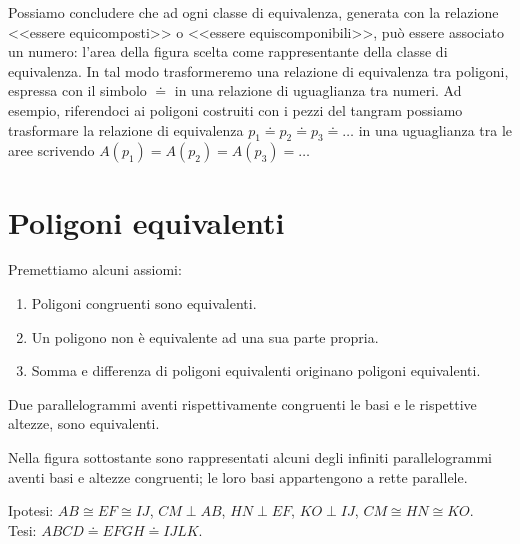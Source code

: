 Possiamo concludere che ad ogni classe di equivalenza, generata con la relazione <<essere equicomposti>> o <<essere equiscomponibili>>, può essere associato un numero: l'area della figura scelta come rappresentante della classe di equivalenza. In tal modo trasformeremo una relazione di equivalenza tra poligoni, espressa con il simbolo $\doteq$ in una relazione di uguaglianza tra numeri.
Ad esempio, riferendoci ai poligoni costruiti con i pezzi del tangram possiamo trasformare la relazione di equivalenza $p_1\doteq p_2\doteq p_3\doteq \ldots{}$ in una uguaglianza tra le aree scrivendo $A(p_1)=A(p_2)=A(p_3)=\ldots{}$


\section{Poligoni equivalenti}

Premettiamo alcuni assiomi:
\begin{enumerate}
\item Poligoni congruenti sono equivalenti.
\item Un poligono non è equivalente ad una sua parte propria.
\item Somma e differenza di poligoni equivalenti originano poligoni equivalenti.
\end{enumerate}

\begin{teorema}\label{teo:7.1}
Due parallelogrammi aventi rispettivamente congruenti le basi e le rispettive altezze, sono equivalenti.
\end{teorema}

Nella figura sottostante sono rappresentati alcuni degli infiniti parallelogrammi aventi basi e altezze congruenti; le loro basi appartengono a rette parallele. 

\noindent Ipotesi: $AB\cong EF\cong IJ$, $CM\perp AB$, $HN\perp EF$, $KO\perp IJ$, $CM\cong HN\cong KO$.\\
Tesi: $ABCD\doteq EFGH\doteq IJLK$.\\

